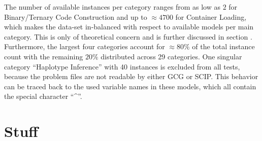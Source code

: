 		The number of available instances per category ranges from as low as $2$ for Binary/Ternary Code Construction and up to $\approx 4700$ for Container Loading, which makes the data-set in-balanced with respect to available models per main category. This is only of theoretical concern and is further discussed in section .
		Furthermore, the largest four categories account for $\approx 80\%$ of the total instance count with the remaining $20\%$ distributed across 29 categories.
		One singular category \enquote{Haplotype Inference} with 40 instances is excluded from all tests, because the problem files are not readable by either \acs{GCG} or \acs{SCIP}. This behavior can be traced back to the used variable names in these models, which all contain the special character \enquote{\^}.
	
	\section{Stuff}
	